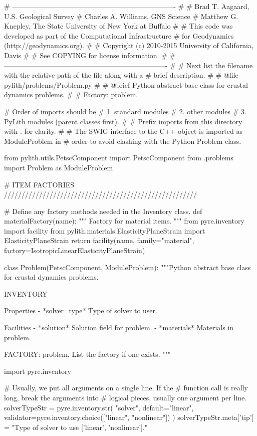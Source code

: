 \begin{python}
# ----------------------------------------------------------------------
#
# Brad T. Aagaard, U.S. Geological Survey
# Charles A. Williams, GNS Science
# Matthew G. Knepley, The State University of New York at Buffalo
#
# This code was developed as part of the Computational Infrastructure
# for Geodynamics (http://geodynamics.org).
#
# Copyright (c) 2010-2015 University of California, Davis
#
# See COPYING for license information.
#
# ----------------------------------------------------------------------
# 
# Next list the filename with the relative path of the file along with a
# brief description.
#  
# @file pylith/problems/Problem.py
#
# @brief Python abstract base class for crustal dynamics problems.
#
# Factory: problem.

# Order of imports should be
# 1. standard modules
# 2. other modules
# 3. PyLith modules (parent classes first).
#
# Prefix imports from this directory with . for clarity.
#  
# The SWIG interface to the C++ object is imported as ModuleProblem in
# order to avoid clashing with the Python Problem class.

from pylith.utils.PetscComponent import PetscComponent
from .problems import Problem as ModuleProblem

# ITEM FACTORIES ///////////////////////////////////////////////////////

# Define any factory methods needed in the Inventory class.
def materialFactory(name):
    """
    Factory for material items.
    """
    from pyre.inventory import facility
    from pylith.materials.ElasticityPlaneStrain import ElasticityPlaneStrain
    return facility(name, family="material", factory=IsotropicLinearElasticityPlaneStrain)

class Problem(PetscComponent, ModuleProblem):
    """Python abstract base class for crustal dynamics problems.

    INVENTORY

    Properties
      - *solver_type* Type of solver to user.

    Facilities
      - *solution* Solution field for problem.
      - *materials* Materials in problem.
      
    FACTORY: problem. List the factory if one exists.
    """

    import pyre.inventory

    # Usually, we put all arguments on a single line. If the
    # function call is really long, break the arguments into
    # logical pieces, usually one argument per line.
    solverTypeStr = pyre.inventory.str(
        "solver",
        default="linear",
        validator=pyre.inventory.choice(["linear", "nonlinear"])
    )
    solverTypeStr.meta['tip'] = "Type of solver to use ['linear', 'nonlinear']."


\end{python}
